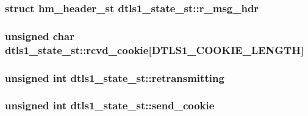 \subsubsection[{\texorpdfstring{r\+\_\+msg\+\_\+hdr}{r_msg_hdr}}]{\setlength{\rightskip}{0pt plus 5cm}struct {\bf hm\+\_\+header\+\_\+st} dtls1\+\_\+state\+\_\+st\+::r\+\_\+msg\+\_\+hdr}\hypertarget{structdtls1__state__st_a1c6a7daa242306285d142a607d0a63b1}{}\label{structdtls1__state__st_a1c6a7daa242306285d142a607d0a63b1}
\subsubsection[{\texorpdfstring{rcvd\+\_\+cookie}{rcvd_cookie}}]{\setlength{\rightskip}{0pt plus 5cm}unsigned char dtls1\+\_\+state\+\_\+st\+::rcvd\+\_\+cookie\mbox{[}{\bf D\+T\+L\+S1\+\_\+\+C\+O\+O\+K\+I\+E\+\_\+\+L\+E\+N\+G\+TH}\mbox{]}}\hypertarget{structdtls1__state__st_a1a9425f1e37d872f3cc13026092b4ac6}{}\label{structdtls1__state__st_a1a9425f1e37d872f3cc13026092b4ac6}
\subsubsection[{\texorpdfstring{retransmitting}{retransmitting}}]{\setlength{\rightskip}{0pt plus 5cm}unsigned int dtls1\+\_\+state\+\_\+st\+::retransmitting}\hypertarget{structdtls1__state__st_a55559920472b96c76fbe4b1bf83c62e5}{}\label{structdtls1__state__st_a55559920472b96c76fbe4b1bf83c62e5}
\subsubsection[{\texorpdfstring{send\+\_\+cookie}{send_cookie}}]{\setlength{\rightskip}{0pt plus 5cm}unsigned int dtls1\+\_\+state\+\_\+st\+::send\+\_\+cookie}\hypertarget{structdtls1__state__st_af87b8915e3c04aa1e8c858e15a967b2d}{}\label{structdtls1__state__st_af87b8915e3c04aa1e8c858e15a967b2d}
